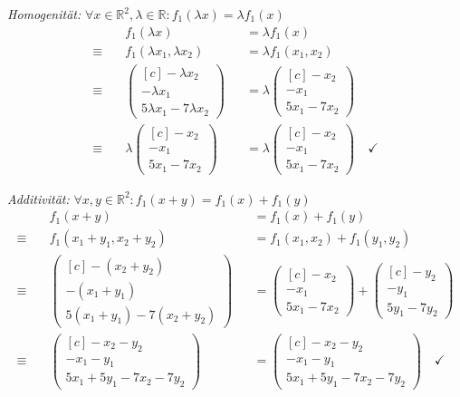 \documentclass[answers]{exam}
\newcommand{\vektor}[1]{\begin{pmatrix*}[c] #1 \end{pmatrix*}}
\newcommand{\R}{\mathbb{R}}
\begin{document}
\begin{questions}
\begin{parts}
\begin{solution}
            \emph{Homogenität:} $\forall x \in \R^2, \lambda \in \R: f_1(\lambda  x) = \lambda  f_1(x)$
            $$
                \begin{aligned}
                                 & f_1(\lambda  x)                 &  & = \lambda  f_1(x)        \\
                    \equiv \quad & f_1(\lambda  x_1, \lambda  x_2) &  & = \lambda  f_1(x_1, x_2) \\
                    \equiv \quad & \vektor{-\lambda  x_2                                         \\ -\lambda  x_1 \\ 5 \lambda  x_1-7  \lambda  x_2} &&= \lambda  \vektor{-x_2 \\ -x_1 \\ 5x_1-7x_2} \\
                    \equiv \quad & \lambda  \vektor{-x_2                                         \\ -x_1 \\ 5x_1-7x_2} &&= \lambda  \vektor{-x_2 \\ -x_1 \\ 5x_1-7x_2} \quad \checkmark
                \end{aligned}
            $$

            \emph{Additivität:} $\forall x, y \in \R^2: f_1(x + y) = f_1(x) + f_1(y)$
            $$
                \begin{aligned}
                                 & f_1(x + y)                &  & = f_1(x) + f_1(y)               \\
                    \equiv \quad & f_1(x_1 + y_1, x_2 + y_2) &  & = f_1(x_1, x_2) + f_1(y_1, y_2) \\
                    \equiv \quad & \vektor{-(x_2 + y_2)                                           \\ -(x_1 + y_1) \\ 5(x_1 + y_1)-7(x_2 + y_2)} &&= \vektor{-x_2 \\ -x_1 \\ 5x_1-7x_2} + \vektor{-y_2 \\ -y_1 \\ 5y_1-7y_2}\\
                    \equiv \quad & \vektor{-x_2-y_2                                               \\ -x_1 - y_1 \\ 5x_1 + 5y_1-7x_2 - 7y_2} &&= \vektor{-x_2-y_2 \\ -x_1 - y_1 \\ 5x_1 + 5y_1-7x_2 - 7y_2} \quad \checkmark
                \end{aligned}
            $$


\end{solution}
\end{parts}
\end{questions}
\end{document}

